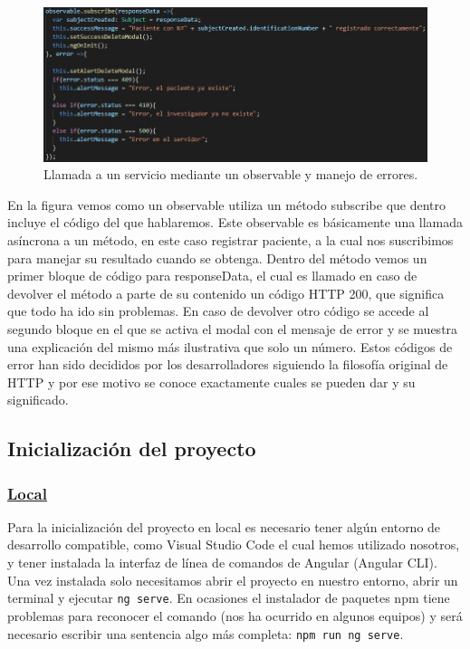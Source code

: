     \begin{figure}[h]
    \centering
    \includegraphics[width=1\textwidth]{images/observableAndErrors.jpg}
    \caption{Llamada a un servicio mediante un observable y manejo de errores.}
    \end{figure}
    \FloatBarrier
    
    En la figura vemos como un observable utiliza un método subscribe que dentro incluye el código del que hablaremos. Este observable es básicamente una llamada asíncrona a un método, en este caso registrar paciente, a la cual nos suscribimos para manejar su resultado cuando se obtenga. Dentro del método vemos un primer bloque de código para responseData, el cual es llamado en caso de devolver el método a parte de su contenido un código HTTP 200, que significa que todo ha ido sin problemas. En caso de devolver otro código se accede al segundo bloque en el que se activa el modal con el mensaje de error y se muestra una explicación del mismo más ilustrativa que solo un número. Estos códigos de error han sido decididos por los desarrolladores siguiendo la filosofía original de HTTP y por ese motivo se conoce exactamente cuales se pueden dar y su significado.\newpage
    
    \subsection{Inicialización del proyecto}
    
        \subsubsection{\underline{Local}}
        
        Para la inicialización del proyecto en local es necesario tener algún entorno de desarrollo compatible, como Visual Studio Code el cual hemos utilizado nosotros, y tener instalada la interfaz de línea de comandos de Angular (Angular CLI). Una vez instalada solo necesitamos abrir el proyecto en nuestro entorno, abrir un terminal y ejecutar \texttt{ng serve}. En ocasiones el instalador de paquetes npm tiene problemas para reconocer el comando (nos ha ocurrido en algunos equipos) y será necesario escribir una sentencia algo más completa: \texttt{npm run ng serve}.
